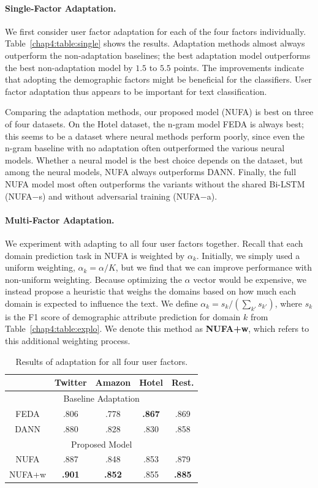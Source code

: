 \paragraph{Single-Factor Adaptation.} We first consider user factor adaptation for each of the four factors individually. 
Table~\ref{chap4:table:single} shows the results.
Adaptation methods almost always outperform the non-adaptation baselines;
the best adaptation model outperforms the best non-adaptation model by $1.5$ to $5.5$ points. 
The improvements indicate that adopting the demographic factors might be beneficial for the classifiers. User factor adaptation thus appears to be important for text classification. 

Comparing the adaptation methods,
our proposed model (NUFA) is best on three of four datasets.
On the Hotel dataset, the n-gram model FEDA is always best;
this seems to be a dataset where neural methods perform poorly, since even the n-gram baseline with no adaptation often outperformed the various neural models. 
Whether a neural model is the best choice depends on the dataset,
but among the neural models, NUFA always outperforms DANN.
Finally, the full NUFA model most often outperforms the variants without the shared Bi-LSTM (NUFA$-$s) and without adversarial training (NUFA$-$a). 


\paragraph{Multi-Factor Adaptation.} We experiment with adapting to all four user factors together.
Recall that each domain prediction task in NUFA is weighted by $\alpha_k$.
Initially, we simply used a uniform weighting, $\alpha_k = \alpha/K$,
but we find that we can improve performance with non-uniform weighting.
Because optimizing the $\alpha$ vector would be expensive, 
we instead propose a heuristic that weighs the domains
based on how much each domain is expected to influence the text.
We define $\alpha_k = s_k / (\sum_{k'} s_{k'})$, where $s_k$ is the F1 score of demographic attribute prediction for domain $k$ from Table~\ref{chap4:table:explo}.
We denote this method as {\bf NUFA+w}, which refers to this additional weighting process.

\begin{table}[htp]
\centering
\begin{tabular}{c|c|c|c|c}
 & Twitter & Amazon & Hotel & Rest. \\\hline
\multicolumn{5}{c}{Baseline Adaptation} \\\hline
FEDA & .806 & .778 & \bf .867 & .869 \\\hline
DANN & .880 & .828 & .830 & .858 \\\hline
\multicolumn{5}{c}{Proposed Model} \\\hline
NUFA & .887 & .848 & .853 & .879 \\
NUFA+w & \bf .901 & \bf .852 & .855 & \bf .885 \\
\end{tabular}
\caption{Results of adaptation for all four user factors.}
\label{chap4:table:multi}
\end{table}

